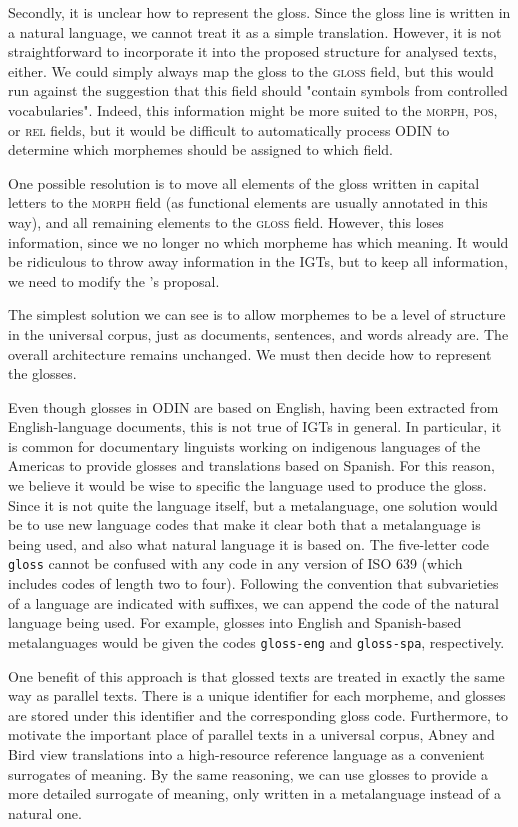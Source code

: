 Secondly, it is unclear how to represent the gloss.  Since the gloss line is written in a natural language, we cannot treat it as a simple translation.  However, it is not straightforward to incorporate it into the proposed structure for analysed texts, either.  We could simply always map the gloss to the \textsc{gloss} field, but this would run against the suggestion that this field should "contain symbols from controlled vocabularies".  Indeed, this information might be more suited to the \textsc{morph, pos,} or \textsc{rel} fields, but it would be difficult to automatically process ODIN to determine which morphemes should be assigned to which field.

One possible resolution is to move all elements of the gloss written in capital letters to the \textsc{morph} field (as functional elements are usually annotated in this way), and all remaining elements to the \textsc{gloss} field.  However, this loses information, since we no longer no which morpheme has which meaning.  It would be ridiculous to throw away information in the IGTs, but to keep all information, we need to modify the 's proposal.

The simplest solution we can see is to allow morphemes to be a level of structure in the universal corpus, just as documents, sentences, and words already are.  The overall architecture remains unchanged.  We must then decide how to represent the glosses.

Even though glosses in ODIN are based on English, having been extracted from English-language documents, this is not true of IGTs in general.  In particular, it is common for documentary linguists working on indigenous languages of the Americas to provide glosses and translations based on Spanish.  For this reason, we believe it would be wise to specific the language used to produce the gloss.  Since it is not quite the language itself, but a metalanguage, one solution would be to use new language codes that make it clear both that a metalanguage is being used, and also what natural language it is based on.  The five-letter code \texttt{gloss} cannot be confused with any code in any version of ISO 639 (which includes codes of length two to four).  Following the convention that subvarieties of a language are indicated with suffixes, we can append the code of the natural language being used.  For example, glosses into English and Spanish-based metalanguages would be given the codes \texttt{gloss-eng} and \texttt{gloss-spa}, respectively.

One benefit of this approach is that glossed texts are treated in exactly the same way as parallel texts.  There is a unique identifier for each morpheme, and glosses are stored under this identifier and the corresponding gloss code.  Furthermore, to motivate the important place of parallel texts in a universal corpus, Abney and Bird view translations into a high-resource reference language as a convenient surrogates of meaning. By the same reasoning, we can use glosses to provide a more detailed surrogate of meaning, only written in a metalanguage instead of a natural one.
